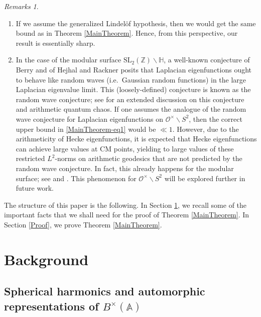 \documentclass[11pt]{amsart}
\newcommand{\bigo}{\mathcal{O}}
\newcommand{\A}{\mathbb{A}}
\theoremstyle{definition}
\theoremstyle{remark}
\newtheorem{remarks}[theorem]{Remarks}
\begin{document}
\begin{remarks}
\begin{enumerate}
    \item[(4)] If we assume the generalized Lindel{\"o}f hypothesis, then we would get the same bound as in Theorem \ref{MainTheorem}. Hence, from this perspective, our result is essentially sharp. 
    \item[(5)] In the case of the modular surface $\mathrm{SL}_{2}(\mathbb{Z}) \backslash \mathbb{H}$, a well-known conjecture of Berry \cite{Berry1977} and of Hejhal and Rackner \cite{HejhalRackner} posits that Laplacian eigenfunctions ought to behave like random waves (i.e.~Gaussian random functions) in the large Laplacian eigenvalue limit. This (loosely-defined) conjecture is known as the random wave conjecture; see \cite{SarnakAQC} for an extended discussion on this conjecture and arithmetic quantum chaos. If one assumes the analogue of the random wave conjecture for Laplacian eigenfunctions on $\bigo^{\times} \backslash S^2$, then the correct upper bound in \eqref{MainTheorem-eq1} would be $\ll 1$. However, due to the arithmeticity of Hecke eigenfunctions, it is expected that Hecke eigenfunctions can achieve large values at CM points, yielding to large values of these restricted $L^2$-norms on arithmetic geodesics that are not predicted by the random wave conjecture. In fact, this already happens for the modular surface; see \cite{Michels} and \cite{Milicevic}. This phenomenon for $\bigo^{\times} \backslash S^2$ will be explored further in future work.
\end{enumerate}
\end{remarks}

The structure of this paper is the following. In Section \ref{Background}, we recall some of the important facts that we shall need for the proof of Theorem \ref{MainTheorem}. In Section \ref{Proof}, we prove Theorem \ref{MainTheorem}.









\section{Background}\label{Background}




\subsection{Spherical harmonics and automorphic representations of \texorpdfstring{$B^{\times}(\A)$}{B(A)}}\label{SpherHarmonics}
\end{document}
